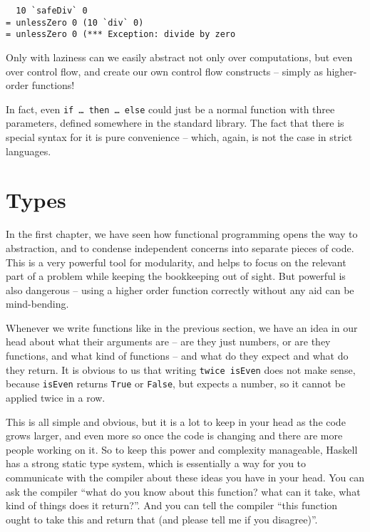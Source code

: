 \documentclass[11pt,
  american,
  DIV13]{article}
\begin{document}
\begin{verbatim}
  10 `safeDiv` 0
= unlessZero 0 (10 `div` 0)
= unlessZero 0 (*** Exception: divide by zero
\end{verbatim}

Only with laziness can we easily abstract not only over computations,
but even over control flow, and create our own control flow constructs
-- simply as higher-order functions!

In fact, even \texttt{if\ \ldots{}\ then\ \ldots{}\ else} could just be
a normal function with three parameters, defined somewhere in the
standard library. The fact that there is special syntax for it is pure
convenience -- which, again, is not the case in strict languages.

\hypertarget{types}{%
\section{Types}\label{types}}

In the first chapter, we have seen how functional programming opens the
way to abstraction, and to condense independent concerns into separate
pieces of code. This is a very powerful tool for modularity, and helps
to focus on the relevant part of a problem while keeping the bookkeeping
out of sight. But powerful is also dangerous -- using a higher order
function correctly without any aid can be mind-bending.

Whenever we write functions like in the previous section, we have an
idea in our head about what their arguments are -- are they just
numbers, or are they functions, and what kind of functions -- and what
do they expect and what do they return. It is obvious to us that writing
\texttt{twice\ isEven} does not make sense, because \texttt{isEven}
returns \texttt{True} or \texttt{False}, but expects a number, so it
cannot be applied twice in a row.

This is all simple and obvious, but it is a lot to keep in your head as
the code grows larger, and even more so once the code is changing and
there are more people working on it. So to keep this power and
complexity manageable, Haskell has a strong static type system, which is
essentially a way for you to communicate with the compiler about these
ideas you have in your head. You can ask the compiler ``what do you know
about this function? what can it take, what kind of things does it
return?''. And you can tell the compiler ``this function ought to take
this and return that (and please tell me if you disagree)''.
\end{document}

